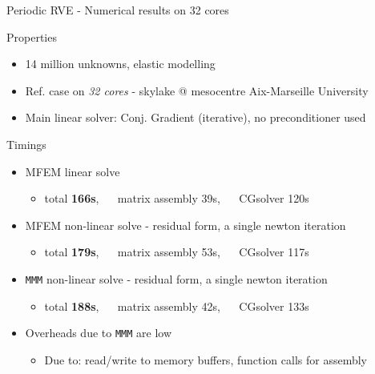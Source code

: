 \documentclass{beamer}
\newcommand{\mmm}{\texttt{MMM}}
\begin{document}
\begin{frame}{Periodic
    RVE - Numerical results on 32 cores}
  \begin{block}{Properties}
    \begin{itemize}
      \item 14 million unknowns, elastic modelling
      \item Ref. case on \emph{32 cores} - skylake @
      mesocentre Aix-Marseille University
      \item Main linear solver: Conj. Gradient (iterative),
      no preconditioner used
    \end{itemize}
  \end{block}
  \vspace*{2mm}
  \begin{block}{Timings}
    \begin{itemize}
      \item MFEM linear solve
      \begin{itemize}
        \item total \textbf{166s}, ~~ matrix assembly 39s,
        ~~ CGsolver 120s
      \end{itemize}
      \item MFEM non-linear solve - residual form, a single
      newton iteration
      \begin{itemize}
        \item total \textbf{179s}, ~~ matrix assembly 53s,
        ~~ CGsolver 117s
      \end{itemize}
      \item \mmm{} non-linear solve - residual form, a
      single newton iteration
      \begin{itemize}
        \item total \textbf{188s}, ~~ matrix assembly 42s,
        ~~ CGsolver 133s
      \end{itemize}
      \item Overheads due to \mmm{} are low
      \begin{itemize}
        \item Due to: read/write to memory buffers,
        function calls for assembly
      \end{itemize}
    \end{itemize}
  \end{block}
\end{frame}
\end{document}
